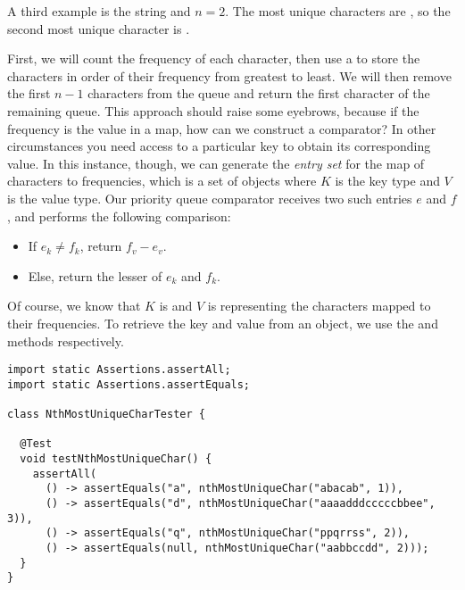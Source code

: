 A third example is the string  and $n=2$. The most unique characters are , so the second most unique character is .

First, we will count the frequency of each character, then use a  to store the characters in order of their frequency from greatest to least. We will then remove the first $n-1$ characters from the queue and return the first character of the remaining queue. This approach should raise some eyebrows, because if the frequency is the value in a map, how can we construct a comparator? In other circumstances you need access to a particular key to obtain its corresponding value. In this instance, though, we can generate the \emph{entry set} for the map of characters to frequencies, which is a set of  objects where $K$ is the key type and $V$ is the value type. Our priority queue comparator receives two such entries $e$ and $f$, and performs the following comparison:

\begin{itemize}
  \item If $e_k \neq f_k$, return $f_v - e_v$.
  \item Else, return the lesser of $e_k$ and $f_k$.
\end{itemize}

Of course, we know that $K$ is  and $V$ is  representing the characters mapped to their frequencies. To retrieve the key and value from an  object, we use the  and  methods respectively. 

\begin{cl}[]{}
\begin{lstlisting}[language=MyJava]
import static Assertions.assertAll;
import static Assertions.assertEquals;

class NthMostUniqueCharTester {

  @Test
  void testNthMostUniqueChar() {
    assertAll(
      () -> assertEquals("a", nthMostUniqueChar("abacab", 1)),
      () -> assertEquals("d", nthMostUniqueChar("aaaadddcccccbbee", 3)),
      () -> assertEquals("q", nthMostUniqueChar("ppqrrss", 2)),
      () -> assertEquals(null, nthMostUniqueChar("aabbccdd", 2)));
  }
}
\end{lstlisting}
\end{cl}

